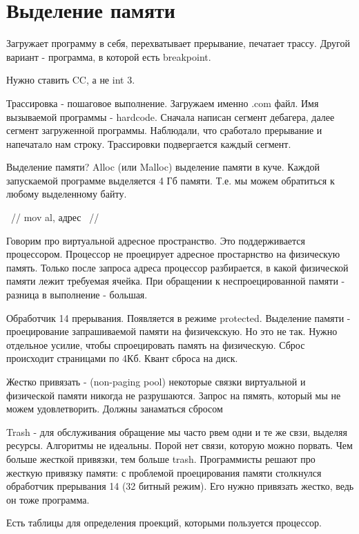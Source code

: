 \section{Выделение памяти}
Загружает программу в себя, перехватывает прерывание, печатает трассу. 
Другой вариант - программа, в которой есть breakpoint. 
\begin{rem}Нужно ставить CC, а не int 3.\end{rem}

Трассировка - пошаговое выполнение. Загружаем именно .com файл. Имя вызываемой программы - hardcode. Сначала написан сегмент дебагера, далее сегмент загруженной программы. Наблюдали, что сработало прерывание и напечатало нам строку. Трассировки подвергается каждый сегмент. 

Выделение памяти? Alloc (или Malloc) выделение памяти в куче. Каждой запускаемой программе выделяется 4 Гб памяти. Т.е. мы можем обратиться к любому выделенному байту. 

~//
mov al, адрес
~//

Говорим про виртуальной адресное пространство. Это поддерживается процессором. Процессор не проецирует адресное простарнство на физическую память. Только после запроса адреса процессор разбирается, в какой физической памяти лежит требуемая ячейка. При обращении к неспроецированной памяти - разница в выполнение - большая. 

Обработчик 14 прерывания. Появляется в режиме protected. Выделение памяти - проецирование запрашиваемой памяти на физичекскую. Но это не так. Нужно отдельное усилие, чтобы спроецировать память на физическую. Сброс происходит страницами по 4Кб. Квант сброса на диск.  

\begin{rem} Жестко привязать - (non-paging pool) некоторые связки виртуальной и физической памяти никогда не разрушаются. Запрос на пямять, который мы не можем удовлетворить. Должны занаматься сбросом\end{rem}


Trash - для обслуживания обращение мы часто рвем одни и те же свзи, выделяя ресурсы. Алгоритмы не идеальны. Порой нет связи, которую можно порвать. Чем больше жесткой привязки, тем больше trash.
Программисты решают про жесткую привязку памяти: с проблемой проецирования памяти столкнулся обработчик прерывания 14 (32 битный режим). Его нужно привязать жестко, ведь он тоже программа.

Есть таблицы для определения проекций, которыми пользуется процессор.


